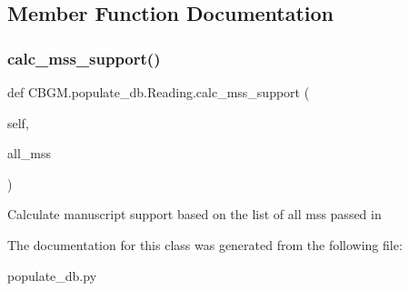 \subsection{Member Function Documentation}
\mbox{\label{classCBGM_1_1populate__db_1_1Reading_a3bf5a41e1c3e75a3e68ccd875abaec14}} 
\subsubsection{\texorpdfstring{calc\+\_\+mss\+\_\+support()}{calc\_mss\_support()}}
{\footnotesize\ttfamily def C\+B\+G\+M.\+populate\+\_\+db.\+Reading.\+calc\+\_\+mss\+\_\+support (\begin{DoxyParamCaption}\item[{}]{self,  }\item[{}]{all\+\_\+mss }\end{DoxyParamCaption})}

\begin{DoxyVerb}Calculate manuscript support based on the list of all mss passed in
\end{DoxyVerb}
 

The documentation for this class was generated from the following file\+:\begin{DoxyCompactItemize}
\item 
populate\+\_\+db.\+py\end{DoxyCompactItemize}
